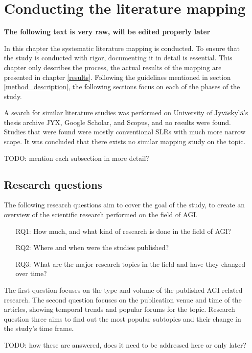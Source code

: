 \documentclass[utf8,english]{gradu3}
\begin{document}
\chapter{Conducting the literature mapping}

\textbf{The following text is very raw, will be edited properly later}

In this chapter the systematic literature mapping is conducted. To ensure that
the study is conducted with rigor, documenting it in detail is essential. This
chapter only describes the process, the actual results of the mapping are
presented in chapter \ref{results}. Following the guidelines mentioned in
section \ref{method_description}, the following sections focus on each of the
phases of the study.

A search for similar literature studies was performed on University of
Jyväskylä's thesis archive JYX, Google Scholar, and Scopus, and no results were
found. Studies that were found were mostly conventional SLRs with much more
narrow scope. It was concluded that there exists no similar mapping study on the
topic.

TODO: mention each subsection in more detail?

\section{Research questions}

The following research questions aim to cover the goal of the study, to create an overview of the scientific research performed on the field of AGI. 

\begin{itemize}
  \item[RQ1:] How much, and what kind of research is done in the field of AGI?
  \item[RQ2:] Where and when were the studies published?
  \item[RQ3:] What are the major research topics in the field and have they
  changed over time?
\end{itemize}

The first question focuses on the type and volume of the published AGI related
research. The second question focuses on the publication venue and time of the
articles, showing temporal trends and popular forums for the topic. Research
question three aims to find out the most popular subtopics and their change in the
study's time frame. 

TODO: how these are answered, does it need to be addressed here or only later?
\end{document}
